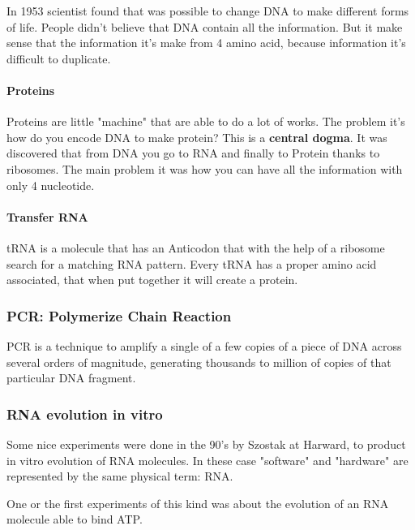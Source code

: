 In 1953 scientist found that was possible to change DNA to make different forms
of life. People didn't believe that DNA contain all the information.
But it make sense that the information it's make from 4 amino acid, because
information it's difficult to duplicate.

\paragraph*{Proteins} Proteins are little "machine" that are able to do a lot
of works. The problem it's how do you encode DNA to make protein? This is a
\textbf{central dogma}. It was discovered that from DNA you go to RNA and
finally to Protein thanks to ribosomes.
The main problem it was how you can have all the information with only
4 nucleotide.

\paragraph*{Transfer RNA} tRNA is a molecule that has an Anticodon that with
the help of a ribosome search for a matching RNA pattern. Every tRNA has a
proper amino acid associated, that when put together it will create a protein.

\subsubsection{PCR: Polymerize Chain Reaction}
PCR is a technique to amplify a single of a few copies of a piece of DNA across
several orders of magnitude, generating thousands to million of copies of that
particular DNA fragment.

\subsubsection{RNA evolution in vitro}
Some nice experiments were done in the 90's by Szostak at Harward, to product
in vitro evolution of RNA molecules. In these case "software" and "hardware"
are represented by the same physical term: RNA.

One or the first experiments of this kind was about the evolution of an RNA
molecule able to bind ATP.
